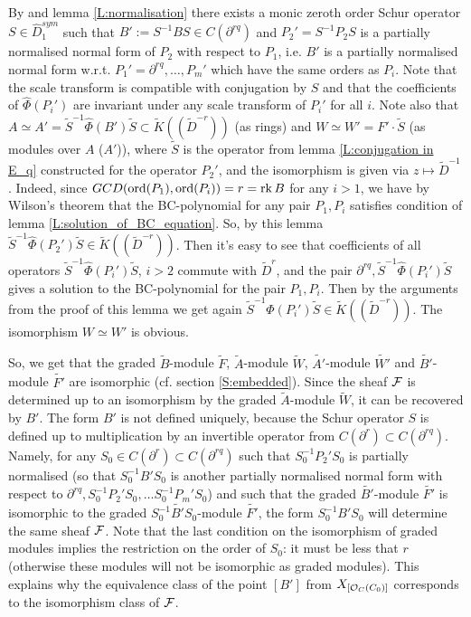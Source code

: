 \documentclass[11pt]{article}
\theoremstyle{definition}
\newcommand{\ord}{\mathop{\rm ord}\nolimits}
\newcommand{\rk}{\mathop {\rm rk}}
\theoremstyle{plain}
\numberwithin{equation}{section}
\newcommand{\co}{{{\cal O}}}
\newcommand{\cf}{{{\cal F}}}
\begin{document}
By  \cite[Prop. 2.3]{GZ24}  and lemma \ref{L:normalisation} there exists a monic zeroth order  Schur operator $S\in \hat{D}_1^{sym}$ such that $B':=S^{-1}BS\in C(\partial^{rq})$ and $P_2'=S^{-1}P_2S$ is a partially normalised normal form of $P_2$ with respect to $P_1$, i.e. $B'$ is a partially normalised normal form w.r.t. $P_1'=\partial^{rq}, \ldots ,P_m'$ which have the same orders as $P_i$. Note that the scale transform is compatible with conjugation by $S$ and that the coefficients of $\hat{\Phi}(P_i')$ are invariant under any scale transform of $P_i'$ for all $i$. Note also that $A\simeq A'=\tilde{S}^{-1}\hat{\Phi}(B')\tilde{S}\subset \tilde{K}((\tilde{D}^{-r}))$ (as rings) and $W\simeq W'=F'\cdot \tilde{S}$ (as modules over $A$ ($A'$)), where $\tilde{S}$ is the operator from lemma \ref{L:conjugation in E_q} constructed for the operator $P_2'$, and the isomorphism is given via $z\mapsto \tilde{D}^{-1}$. Indeed, since $GCD(\ord (P_1),\ord (P_i))=r=\rk B$ for any $i>1$, we have by Wilson's theorem that the BC-polynomial for any pair $P_1,P_i$ satisfies condition of lemma \ref{L:solution_of_BC_equation}. So, by this lemma $\tilde{S}^{-1}\hat{\Phi}(P_2')\tilde{S}\in \tilde{K}((\tilde{D}^{-r}))$. Then it's easy to see that coefficients of all operators $\tilde{S}^{-1}\hat{\Phi}(P_i')\tilde{S}$, $i>2$ commute with $\tilde{D}^r$, and the pair $\partial^{rq}, \tilde{S}^{-1}\hat{\Phi}(P_i')\tilde{S}$ gives a solution to the BC-polynomial for the pair $P_1,P_i$. Then by the arguments from the proof of this lemma we get again $\tilde{S}^{-1}\hat{\Phi}(P_i')\tilde{S}\in \tilde{K}((\tilde{D}^{-r}))$. The isomorphism $W\simeq W'$ is obvious.

So, we get that the graded $\tilde{B}$-module $\tilde{F}$, $\tilde{A}$-module $\tilde{W}$, $\tilde{A'}$-module $\tilde{W'}$ and $\tilde{B'}$-module $\tilde{F'}$ are isomorphic (cf. section \ref{S:embedded}). Since the sheaf $\cf$ is determined up to an isomorphism by the graded $\tilde{A}$-module $\tilde{W}$, it can be recovered by $B'$. The form $B'$ is not defined uniquely, because the Schur operator $S$ is defined up to multiplication by an invertible operator from $C(\partial^r)\subset C(\partial^{rq})$. Namely, for any $S_0\in C(\partial^r)\subset C(\partial^{rq})$ such that $S_0^{-1}P_2'S_0$ is partially normalised (so that $S_0^{-1}B'S_0$ is another partially normalised normal form with respect to $\partial^{rq},S_0^{-1}P_2'S_0, \ldots S_0^{-1}P_m'S_0$) and such that the graded $\tilde{B'}$-module $\tilde{F'}$ is isomorphic to the graded $S_0^{-1}\tilde{B'}S_0$-module $\tilde{F'}$, the form $S_0^{-1}B'S_0$ will determine the same sheaf $\cf$. Note that the last condition on the isomorphism of graded modules implies the restriction on the order of $S_0$: it must be less that $r$ (otherwise these modules will not be isomorphic as graded modules). This explains why the equivalence class of the point $[B']$ from $X_{[\co_C(C_0)]}$ corresponds to the isomorphism class of $\cf$.
\end{document}
